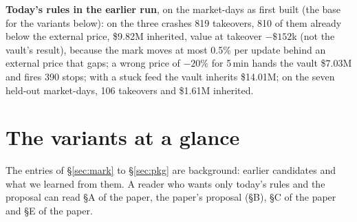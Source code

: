 \documentclass[10.5pt,a4paper]{article}
\begin{document}
\textbf{Today's rules in the earlier run}, on the market-days as first built (the base for the variants below): on the three crashes 819 takeovers, 810 of them already below the external price, \$9.82M inherited, value at takeover $-\$152$k (not the vault's result), because the mark moves at most 0.5\% per update behind an external price that gaps; a wrong price of $-20\%$ for 5\,min hands the vault \$7.03M and fires 390 stops; with a stuck feed the vault inherits \$14.01M; on the seven held-out market-days, 106 takeovers and \$1.61M inherited.

\section*{The variants at a glance}
The entries of \S\ref{sec:mark} to \S\ref{sec:pkg} are background: earlier candidates and what we learned from them. A reader who wants only today's rules and the proposal can read \S A of the paper, the paper's proposal (\S B), \S C of the paper and \S E of the paper.\par
\end{document}
